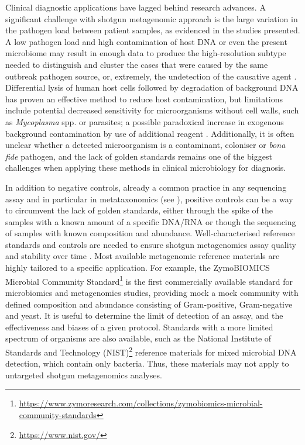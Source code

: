 Clinical diagnostic applications have lagged behind research advances. A significant challenge with shotgun metagenomic approach is the large variation in the pathogen load between patient samples, as evidenced in the studies presented. A low pathogen load and  high contamination of host DNA or even the present microbiome may result in enough data to produce the high-resolution subtype needed to distinguish and cluster the cases that were caused by the same outbreak pathogen source, or, extremely, the undetection of the causative agent \citep{carleton_metagenomic_2019, chiu_clinical_2019}. Differential lysis of human host cells followed by degradation of background DNA has proven an effective method to reduce host contamination, but limitations include potential decreased sensitivity for microorganisms without cell walls, such as \textit{Mycoplasma} spp. or parasites; a possible paradoxical increase in exogenous background contamination by use of additional reagent \citep{salter_reagent_2014, oneil_ribosomal_2013, feehery_method_2013}. Additionally, it is often unclear whether a detected microorganism is a contaminant, coloniser or \textit{bona fide} pathogen, and the lack of golden standards remains one of the biggest challenges when applying these methods in clinical microbiology for diagnosis. 

In addition to negative controls, already a common practice in any sequencing assay and in particular in metataxonomics (see ), positive controls can be a way to circumvent the lack of golden standards, either through the spike of the samples with a known amount of a specific DNA/RNA or though the sequencing of samples with known composition and abundance. Well-characterised reference standards and controls are needed to ensure shotgun metagenomics assay quality and stability over time \citep{chiu_clinical_2019, mcintyre_comprehensive_2017}. Most available metagenomic reference materials are highly tailored to a specific application. For example, the ZymoBIOMICS Microbial Community Standard\footnote{\url{https://www.zymoresearch.com/collections/zymobiomics-microbial-community-standards}} is the first commercially available standard for microbiomics and metagenomics studies, providing mock a mock community with defined composition and abundance consisting of Gram-positive, Gram-negative and yeast. It is useful to determine the limit of detection of an assay, and the effectiveness and biases of a given protocol. Standards with a more limited spectrum of organisms are also available, such as the National Institute of Standards and Technology (NIST)\footnote{\url{https://www.nist.gov/}} reference materials for mixed microbial DNA detection, which contain only bacteria. Thus, these materials may not apply to untargeted shotgun metagenomics analyses.

